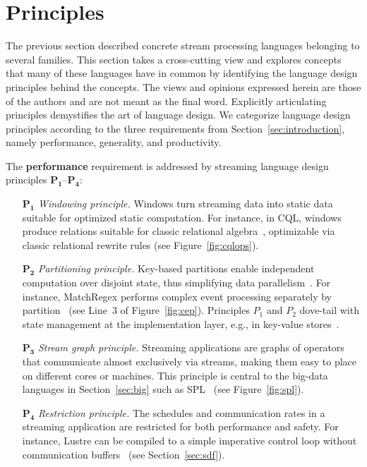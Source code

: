 \section{Principles}\label{sec:principles}

The previous section described concrete stream processing languages
belonging to several families. This section takes a cross-cutting view
and explores concepts that many of these languages have in common by
identifying the language design principles behind the concepts.
The views and opinions expressed herein are those of the authors and
are not meant as the final word.  Explicitly articulating principles
demystifies the art of language design. We categorize language design
principles according to the three requirements from
Section~\ref{sec:introduction}, namely performance, generality, and
productivity.

The \textbf{performance} requirement is addressed by streaming
language design principles $\mathbf{P_1}$--$\mathbf{P_4}$:
\begin{itemize}[leftmargin=6mm]
  \item[$\mathbf{P_1}$] \emph{Windowing principle.} Windows turn streaming
    data into static data suitable for optimized static computation.
    For instance, in CQL, windows produce relations suitable for
    classic relational algebra~\cite{arasu_babu_widom_2006},
    optimizable via classic relational rewrite rules (see
    Figure~\ref{fig:cqlops}).
  \item[$\mathbf{P_2}$] \emph{Partitioning principle.} Key-based partitions
    enable independent computation over disjoint state, thus
    simplifying data parallelism~\cite{schneider_et_al_2015}.
    For instance, MatchRegex performs complex event processing separately by
    partition~\cite{hirzel_2012} (see Line~3 of Figure~\ref{fig:cep}).
    Principles $P_1$ and $P_2$ dove-tail with state management at the
    implementation layer, e.g., in key-value stores~\cite{gedik_et_al_2014}.
  \item[$\mathbf{P_3}$] \emph{Stream graph principle.} Streaming
    applications are graphs of operators that communicate almost
    exclusively via streams, making them easy to place on different
    cores or machines. This principle is central to the big-data
    languages in Section~\ref{sec:big} such as
    SPL~\cite{hirzel_schneider_gedik_2017} (see Figure~\ref{fig:spl}).
  \item[$\mathbf{P_4}$] \emph{Restriction principle.} The schedules and
    communication rates in a streaming application are restricted for
    both performance and safety. For instance, Lustre can be compiled
    to a simple imperative control loop without communication
    buffers~\cite{lustre_1987} (see Section~\ref{sec:sdf}).
\end{itemize}

